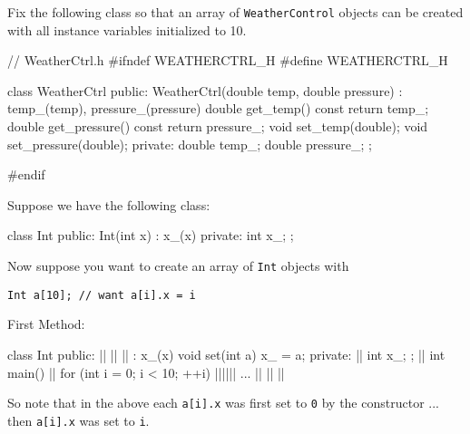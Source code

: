 \begin{ex}
Fix the following class so that an array of
\texttt{WeatherControl} objects can be created with all instance variables
initialized to 10.
\begin{console}
// WeatherCtrl.h
#ifndef WEATHERCTRL_H
#define WEATHERCTRL_H

class WeatherCtrl
{
public:
        WeatherCtrl(double temp, double pressure)
        : temp_(temp), pressure_(pressure)
        {}
        double get_temp() const { return temp_; }
        double get_pressure() const { return pressure_; }
        void set_temp(double);
        void set_pressure(double);
private:
        double temp_;
        double pressure_;
};

#endif
\end{console}
\end{ex}
Suppose we have the following class:

\begin{console}
class Int
{
public:
        Int(int x)
        : x_(x)
        {}
private:
        int x_;
};
\end{console}
Now suppose you want to create an array of \texttt{Int} objects with
\begin{center}
\texttt{Int a[10]; // want a[i].x = i}
\end{center}
First Method:
\begin{consolethree}[escapeinside=||]
class Int
{                      
public:
    || || ||  
        : x_(x) {}
    void set(int a)    
    {
        x_ = a;        
    }                  
private:                 ||  
    int x_;
};
||
int main()
{               
    ||
    for (int i = 0; i < 10; ++i)
        ||||||
    ... || || ||
}
\end{consolethree}

\newpage So note that in the above each \texttt{a[i].x} was first set to \texttt{0} by the constructor ... then \texttt{a[i].x} was set to \texttt{i}.

